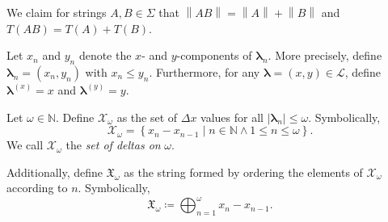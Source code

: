\documentclass[11pt, letterpaper]{article}
\begin{document}
\begin{remark}
	We claim for strings $A,B\in \Sigma $ that $\left\lVert AB \right\rVert =\left\lVert A \right\rVert +\left\lVert B \right\rVert $ and $T(AB)=T(A)+T(B)$.
\end{remark}
\begin{definition}\label{dfn:10}
	Let $x_n$ and $y_n$ denote the $x$- and $y$-components of $\boldsymbol{\lambda}_n$. More precisely, define $\boldsymbol{\lambda}_n = \left( x_n,y_n \right) $ with $x_n \leq y_n$. Furthermore, for any $\boldsymbol{\lambda} = (x,y)\in \mathcal{L} $, define $\boldsymbol{\lambda} ^{(x)}=x$ and $\boldsymbol{\lambda} ^{(y)}=y$.
\end{definition}
\begin{definition}\label{dfn:11}
	Let $\omega  \in\mathbb{N}$. Define $\mathscr{X}_{\omega } $ as the set of $\Delta x$ values for all $\left| \boldsymbol{\lambda }_n \right| \leq \omega  $. Symbolically,
	\[
		\mathscr{X}_{\omega  }=\left\{  x_n-x_{n-1}\mid n\in\mathbb{N}\land 1\leq n \leq \omega  \right\} 
	.\]
	We call $\mathscr{X} _{\omega } $ the \emph{set of deltas on} $\omega  $.

	Additionally, define $\mathfrak{X}_{\omega   }$ as the string formed by ordering the elements of $\mathscr{X}_{\omega  }$ according to $n$. Symbolically,
	\[
		\mathfrak{X}_{\omega  }\coloneqq \bigoplus_{n=1}^{\omega  }x_n - x_{n-1}
	.\]
\end{definition}
\end{document}
